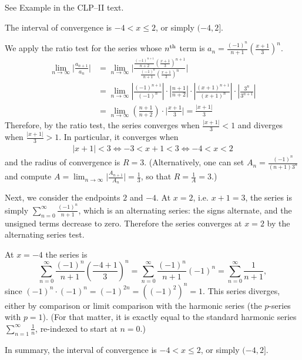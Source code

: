 \begin{hint}
See Example  in the
CLP--II text.
\end{hint}

\begin{answer}
The interval of convergence is $-4<x\le2$, or simply $(-4,2]$.
\end{answer}

\begin{solution}
We apply the ratio test for the series whose $n^{\rm th}$
term is $a_n= \frac{(-1)^n}{n+1} \left(\frac{x+1}{3}\right)^n$.
\begin{align*}
\lim_{n\to\infty} \bigg| \frac{a_{n+1}}{a_n} \bigg|
&= \lim_{n\to\infty} \bigg| \frac{ \frac{(-1)^{n+1}}{n+2} \left(\frac{x+1}{3}\right)^{n+1}}
                       { \frac{(-1)^n}{n+1} \left(\frac{x+1}{3}\right)^n} \bigg| \\
&= \lim_{n\to\infty}\left|\frac{(-1)^{n+1}}{(-1)^n} \right|\cdot\left|\frac{n+1}{n+2} \right|\cdot\left|\frac{(x+1)^{n+1}}{(x+1)^n} \right|\cdot\left|\frac{3^n}{3^{n+1}} \right| \\
&= \lim_{n\to\infty} \left(\frac{n+1}{n+2}\right)\cdot \bigg| \frac{x+1}3 \bigg| = \frac{|x+1|}3
\end{align*}
Therefore, by the ratio test, the series converges when $\frac{|x+1|}3 < 1$
and diverges when $\frac{|x+1|}3 > 1$. In particular, it converges when
\begin{align*}
|x+1| < 3 \iff -3 < x+1 < 3 \iff -4 < x < 2
\end{align*}
and the radius of convergence is $R = 3$. (Alternatively, one can set $A_n = \frac{(-1)^n}{(n+1)3^n}$ and compute
$A = \lim_{n\to\infty} \big| \frac{A_{n+1}}{A_n}\big| = \frac{1}{3}$, so that
$R=\frac{1}{A}=3$.)

Next, we consider the endpoints $2$ and $-4$.
At $x=2$, i.e. $x+1=3$, the series is simply $\sum_{n=0}^\infty \frac{(-1)^{n}}{n+1}$,
which is an alternating series: the signs alternate, and the unsigned terms decrease to zero. Therefore the series converges at $x=2$ by the alternating series test.

At $x=-4$ the series is
$$\sum_{n=0}^\infty \frac{(-1)^{n}}{n+1} \left(\frac{-4+1}{3}\right)^n
 = \sum_{n=0}^\infty \frac{(-1)^{n}}{n+1} (-1)^n
 = \sum_{n=0}^\infty \frac1{n+1},$$
since $(-1)^n \cdot (-1)^n = (-1)^{2n} = \left((-1)^2\right)^n = 1$.
This series diverges, either by comparison or limit comparison with the harmonic series (the $p$-series with $p=1$). (For that matter, it is exactly equal to the standard harmonic
series $\sum_{n=1}^\infty \frac{1}{n}$, re-indexed to start at $n=0$.)

In summary, the interval of convergence is $-4<x\le2$, or simply $(-4,2]$.


\end{solution}



